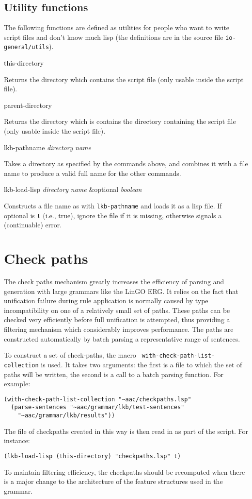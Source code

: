 \documentclass[12pt]{report}
\newcommand{\lispcommand}[1]{\noindent\rm #1}%
\begin{document}
\subsection{Utility functions}

The following functions are defined as utilities for people
who want to write script files and don't know much
lisp  (the definitions are in the source file {\tt io-general/utils}).

\lispcommand{this-directory}

Returns the directory which contains the script file (only
usable inside the script file).

\lispcommand{parent-directory}

Returns the directory which is contains the directory containing 
the script file (only
usable inside the script file).

\lispcommand{lkb-pathname {\it directory} {\it name}}

Takes a directory as specified by the commands above, and combines it
with a file name to produce a valid full name for the other commands.

\lispcommand{lkb-load-lisp {\it directory} {\it name} 
\&optional {\it boolean}}

Constructs a file name as with {\tt lkb-pathname} and loads it
as a lisp file.  If optional is {\tt t} (i.e., true),
ignore the file if it is missing, otherwise signals a (continuable) error.

\section{Check paths}
\label{checkpaths}

The check paths mechanism greatly increases the efficiency of
parsing and generation with large grammars like the LinGO ERG.
It relies on the fact that unification failure during rule application
is normally caused by type incompatibility on one of a relatively
small set of paths.  These paths can be checked very efficiently 
before full unification is attempted, thus providing a filtering
mechanism which considerably improves performance.  The paths
are constructed automatically by batch parsing a representative
range of sentences.

To construct a set of check-paths, the macro {\tt
with-check-path-list-collection} is used.  It takes two arguments: the first is
a file to which the set of paths will be written, the second
is a call to a batch parsing function.  For example:
\begin{verbatim}
(with-check-path-list-collection "~aac/checkpaths.lsp"
  (parse-sentences "~aac/grammar/lkb/test-sentences" 
    "~aac/grammar/lkb/results"))
\end{verbatim}
The file of checkpaths created in this way
is then read in as part of the script.
For instance:
\begin{verbatim}
(lkb-load-lisp (this-directory) "checkpaths.lsp" t)
\end{verbatim}
To maintain filtering efficiency, the checkpaths should be
recomputed when there is a major change to the 
architecture of the feature structures used in the grammar.
\end{document}

